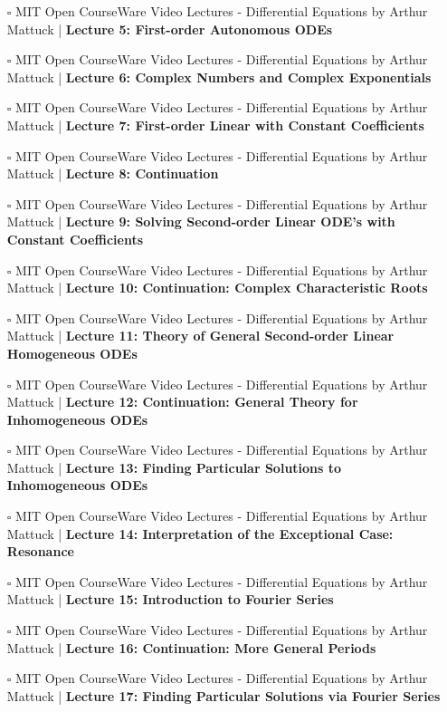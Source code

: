 \documentclass[a4, landscape, 12pt]{article}
\newcommand{\checkbox}{$\square$}%
\begin{document}
\begin{itemize}
{}
\item [\checkbox] MIT Open CourseWare Video Lectures - Differential Equations by Arthur Mattuck  | \textbf{Lecture 5: First-order Autonomous ODEs
}
\item [\checkbox] MIT Open CourseWare Video Lectures - Differential Equations by Arthur Mattuck  | \textbf{Lecture 6: Complex Numbers and Complex Exponentials
}
\item [\checkbox] MIT Open CourseWare Video Lectures - Differential Equations by Arthur Mattuck  | \textbf{Lecture 7: First-order Linear with Constant Coefficients
}
\item [\checkbox] MIT Open CourseWare Video Lectures - Differential Equations by Arthur Mattuck  | \textbf{Lecture 8: Continuation
}
\item [\checkbox] MIT Open CourseWare Video Lectures - Differential Equations by Arthur Mattuck  | \textbf{Lecture 9: Solving Second-order Linear ODE's with Constant Coefficients
}
\item [\checkbox] MIT Open CourseWare Video Lectures - Differential Equations by Arthur Mattuck  | \textbf{Lecture 10: Continuation: Complex Characteristic Roots
}
\item [\checkbox] MIT Open CourseWare Video Lectures - Differential Equations by Arthur Mattuck  | \textbf{Lecture 11: Theory of General Second-order Linear Homogeneous ODEs
}
\item [\checkbox] MIT Open CourseWare Video Lectures - Differential Equations by Arthur Mattuck  | \textbf{Lecture 12: Continuation: General Theory for Inhomogeneous ODEs
}
\item [\checkbox] MIT Open CourseWare Video Lectures - Differential Equations by Arthur Mattuck  | \textbf{Lecture 13: Finding Particular Solutions to Inhomogeneous ODEs
}
\item [\checkbox] MIT Open CourseWare Video Lectures - Differential Equations by Arthur Mattuck  | \textbf{Lecture 14: Interpretation of the Exceptional Case: Resonance
}
\item [\checkbox] MIT Open CourseWare Video Lectures - Differential Equations by Arthur Mattuck  | \textbf{Lecture 15: Introduction to Fourier Series
}
\item [\checkbox] MIT Open CourseWare Video Lectures - Differential Equations by Arthur Mattuck  | \textbf{Lecture 16: Continuation: More General Periods
}
\item [\checkbox] MIT Open CourseWare Video Lectures - Differential Equations by Arthur Mattuck  | \textbf{Lecture 17: Finding Particular Solutions via Fourier Series
}
\end{itemize}
\end{document}
